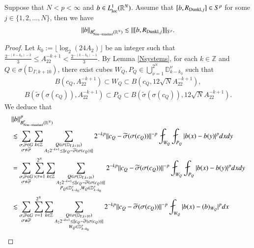 \documentclass[12pt]{amsart}
\begin{document}
\begin{lemma}\label{nonstandard}
Suppose that $N< p<\infty$ and $b\in L^1_{\rm loc}(\mathbb{R}^N)$. Assume that $[b,R_{{\rm Dunkl},j}]\in S^p$ for some $j\in\{1,2,\ldots,N\}$, then we have
\begin{align*}
\|b\|_{B^{p}_{{\rm Non}-{\rm standard}}(\mathbb{R}^N)}\lesssim \|[b,R_{{\rm Dunkl},j}]\|_{S^p}.
\end{align*}
\end{lemma}
\begin{proof}
Let $k_0:=\lfloor \log_2(24A_2) \rfloor$ be an integer such that $\frac{2^{-(k-k_0)-2}}{3}\leq A_22^{-k+1}<\frac{2^{-(k-k_0)-1}}{3}$.
By Lemma \ref{Nsystems}, for each $k\in \mathbb{Z}$ and $Q\in\sigma(\mathbb{D}_{\Gamma,k+10})$, there exist  cubes $W_Q,P_Q\in {\displaystyle\bigcup_{\nu=1}^{2^N}\mathbb{D}_{k-k_0}^\nu}$ such that
\begin{align}\label{Bcontain1}
B(c_Q,A_22^{-k+1})\subset W_Q\subset B(c_Q,12\sqrt{N} A_22^{-k+1}),
\end{align}
\begin{align}\label{Bcontain2}
  B(\widetilde{\sigma}(\sigma(c_Q)),A_22^{-k+1})\subset P_Q\subset B(\widetilde{\sigma}(\sigma(c_Q)),12\sqrt{N} A_22^{-k+1}).
\end{align}
We deduce that
\begin{align*}
&\|b\|_{B^{p}_{{\rm Non}-{\rm standard}}(\mathbb{R}^N)}^p\nonumber\\
&\lesssim \sum_{{\substack{\sigma,\widetilde{\sigma}\in G \\ \sigma\neq \widetilde{\sigma}}}}\sum_{k\in\mathbb{Z}}\sum_{{\substack{Q\in\sigma(\mathbb{D}_{\Gamma,k+10})\nonumber\\ A_22^{-k+1}\leq \|c_Q-\widetilde{\sigma}(\sigma(c_Q))\|}}}2^{-kp}\|c_Q-\widetilde{\sigma}(\sigma(c_Q))\|^{-p}\fint_{W_Q}\fint_{P_Q}|b(x)-b(y)|^pdxdy\\
&=\sum_{{\substack{\sigma,\widetilde{\sigma}\in G \\ \sigma\neq \widetilde{\sigma}}}}\sum_{\nu,\tau=1}^{2^N}\sum_{k\in\mathbb{Z}}\sum_{\substack{Q\in\sigma(\mathbb{D}_{\Gamma,k+10})\nonumber\\ A_22^{-k+1}\leq \|c_Q-\widetilde{\sigma}(\sigma(c_Q))\|\\ P_Q\in\mathbb{D}_{k-k_0}^\nu,W_Q\in\mathbb{D}_{k-k_0}^\tau }}2^{-kp}\|c_Q-\widetilde{\sigma}(\sigma(c_Q))\|^{-p}\fint_{W_Q}\fint_{P_Q}|b(x)-b(y)|^pdxdy\nonumber\\
&\lesssim \sum_{{\substack{\sigma,\widetilde{\sigma}\in G \\ \sigma\neq \widetilde{\sigma}}}}\sum_{\tau=1}^{2^N}\sum_{k\in\mathbb{Z}}\sum_{\substack{Q\in\sigma(\mathbb{D}_{\Gamma,k+10})\nonumber\\ A_22^{-k+1}\leq \|c_Q-\widetilde{\sigma}(\sigma(c_Q))\|\\ W_Q\in\mathbb{D}_{k-k_0}^\tau }}2^{-kp}\|c_Q-\widetilde{\sigma}(\sigma(c_Q))\|^{-p}\fint_{W_Q}|b(x)-(b)_{W_Q}|^pdx\nonumber\\

\end{align*}
\end{proof}
\end{document}
